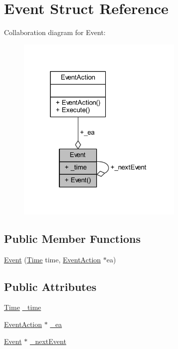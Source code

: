\hypertarget{struct_event}{}\section{Event Struct Reference}
\label{struct_event}


Collaboration diagram for Event\+:
\nopagebreak
\begin{figure}[H]
\begin{center}
\leavevmode
\includegraphics[width=226pt]{struct_event__coll__graph}
\end{center}
\end{figure}
\subsection*{Public Member Functions}
\begin{DoxyCompactItemize}
\item 
\hyperlink{struct_event_a5236b45d6ac7c6ce784c3e39fed03d7d}{Event} (\hyperlink{_simulation_executive_8h_ac2d3e0ba793497bcca555c7c2cf64ff3}{Time} time, \hyperlink{class_event_action}{Event\+Action} $\ast$ea)
\end{DoxyCompactItemize}
\subsection*{Public Attributes}
\begin{DoxyCompactItemize}
\item 
\hyperlink{_simulation_executive_8h_ac2d3e0ba793497bcca555c7c2cf64ff3}{Time} \hyperlink{struct_event_a7077d3af8bbf3d40e3c4570cc4675512}{\+\_\+time}
\item 
\hyperlink{class_event_action}{Event\+Action} $\ast$ \hyperlink{struct_event_aacbbfbf051167338e9febaaa5aad5b73}{\+\_\+ea}
\item 
\hyperlink{struct_event}{Event} $\ast$ \hyperlink{struct_event_a6bc8ec440b4f0b617d58af059e44e43e}{\+\_\+next\+Event}
\end{DoxyCompactItemize}


